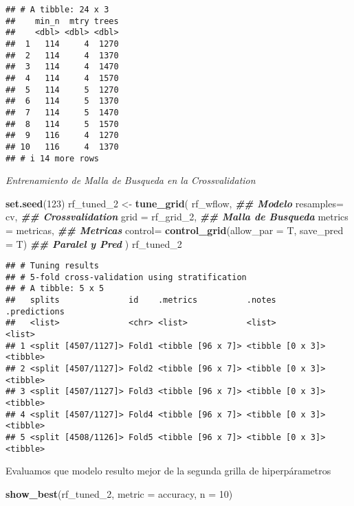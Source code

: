 \documentclass[
]{article}
\newenvironment{Shaded}{\begin{snugshade}}{\end{snugshade}}
\newcommand{\AttributeTok}[1]{\textcolor[rgb]{0.13,0.29,0.53}{#1}}
\newcommand{\DecValTok}[1]{\textcolor[rgb]{0.00,0.00,0.81}{#1}}
\newcommand{\DocumentationTok}[1]{\textcolor[rgb]{0.56,0.35,0.01}{\textbf{\textit{#1}}}}
\newcommand{\FunctionTok}[1]{\textcolor[rgb]{0.13,0.29,0.53}{\textbf{#1}}}
\newcommand{\NormalTok}[1]{#1}
\newcommand{\OtherTok}[1]{\textcolor[rgb]{0.56,0.35,0.01}{#1}}
\newcommand{\StringTok}[1]{\textcolor[rgb]{0.31,0.60,0.02}{#1}}
\begin{document}
\begin{verbatim}
## # A tibble: 24 x 3
##    min_n  mtry trees
##    <dbl> <dbl> <dbl>
##  1   114     4  1270
##  2   114     4  1370
##  3   114     4  1470
##  4   114     4  1570
##  5   114     5  1270
##  6   114     5  1370
##  7   114     5  1470
##  8   114     5  1570
##  9   116     4  1270
## 10   116     4  1370
## # i 14 more rows
\end{verbatim}

\emph{Entrenamiento de Malla de Busqueda en la Crossvalidation}

\begin{Shaded}
\begin{Highlighting}[]
\FunctionTok{set.seed}\NormalTok{(}\DecValTok{123}\NormalTok{)}
\NormalTok{rf\_tuned\_2 }\OtherTok{\textless{}{-}} \FunctionTok{tune\_grid}\NormalTok{(}
\NormalTok{  rf\_wflow, }\DocumentationTok{\#\# Modelo}
  \AttributeTok{resamples=}\NormalTok{ cv, }\DocumentationTok{\#\# Crossvalidation}
  \AttributeTok{grid =}\NormalTok{ rf\_grid\_2, }\DocumentationTok{\#\# Malla de Busqueda}
  \AttributeTok{metrics =}\NormalTok{ metricas, }\DocumentationTok{\#\# Metricas}
  \AttributeTok{control=} \FunctionTok{control\_grid}\NormalTok{(}\AttributeTok{allow\_par =}\NormalTok{ T, }\AttributeTok{save\_pred =}\NormalTok{ T) }\DocumentationTok{\#\# Paralel y Pred}
\NormalTok{)}
\NormalTok{rf\_tuned\_2}
\end{Highlighting}
\end{Shaded}

\begin{verbatim}
## # Tuning results
## # 5-fold cross-validation using stratification 
## # A tibble: 5 x 5
##   splits              id    .metrics          .notes           .predictions
##   <list>              <chr> <list>            <list>           <list>      
## 1 <split [4507/1127]> Fold1 <tibble [96 x 7]> <tibble [0 x 3]> <tibble>    
## 2 <split [4507/1127]> Fold2 <tibble [96 x 7]> <tibble [0 x 3]> <tibble>    
## 3 <split [4507/1127]> Fold3 <tibble [96 x 7]> <tibble [0 x 3]> <tibble>    
## 4 <split [4507/1127]> Fold4 <tibble [96 x 7]> <tibble [0 x 3]> <tibble>    
## 5 <split [4508/1126]> Fold5 <tibble [96 x 7]> <tibble [0 x 3]> <tibble>
\end{verbatim}

Evaluamos que modelo resulto mejor de la segunda grilla de
hiperpárametros

\begin{Shaded}
\begin{Highlighting}[]
\FunctionTok{show\_best}\NormalTok{(rf\_tuned\_2, }\AttributeTok{metric =} \StringTok{\textquotesingle{}accuracy\textquotesingle{}}\NormalTok{, }\AttributeTok{n =} \DecValTok{10}\NormalTok{)}
\end{Highlighting}
\end{Shaded}
\end{document}
